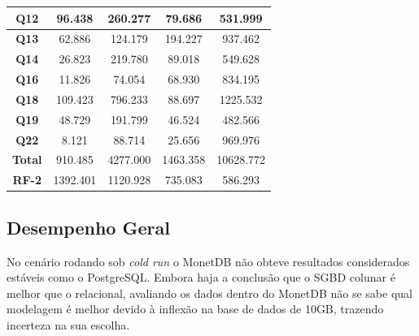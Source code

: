 \begin{table}[t]
\begin{tabular}{|c|c|c|c|c|}
                 \textbf{Q12}         & 96.438            & 260.277                       & 79.686            & 531.999                   \\ 
                \hline
                 \textbf{Q13}         & 62.886            & 124.179                       & 194.227           & 937.462                   \\ 
                \hline
                 \textbf{Q14}         & 26.823            & 219.780                       & 89.018            & 549.628                   \\ 
                \hline
                 \textbf{Q16}         & 11.826            & 74.054                        & 68.930            & 834.195                   \\ 
                \hline
                 \textbf{Q18}         & 109.423           & 796.233                       & 88.697            & 1225.532                  \\ 
                \hline
                 \textbf{Q19}         & 48.729            & 191.799                       & 46.524            & 482.566                   \\ 
                \hline
                 \textbf{Q22}         & 8.121             & 88.714                        & 25.656            & 969.976                   \\ 
                \hline
                 \textbf{Total}       & 910.485           & 4277.000                      & 1463.358          & 10628.772                 \\ 
                \hline
                 \textbf{RF-2}        & 1392.401          & 1120.928                      & 735.083           & 586.293                   \\
                \hline
                \end{tabular}
                \end{table}


\subsection{Desempenho Geral}

No cenário rodando sob \textit{cold run} o MonetDB não obteve resultados considerados estáveis como o PostgreSQL. Embora haja a conclusão que o SGBD colunar é melhor que o relacional, avaliando os dados dentro do MonetDB não se sabe qual modelagem é melhor devido à inflexão na base de dados de 10GB, trazendo incerteza na sua escolha. 

